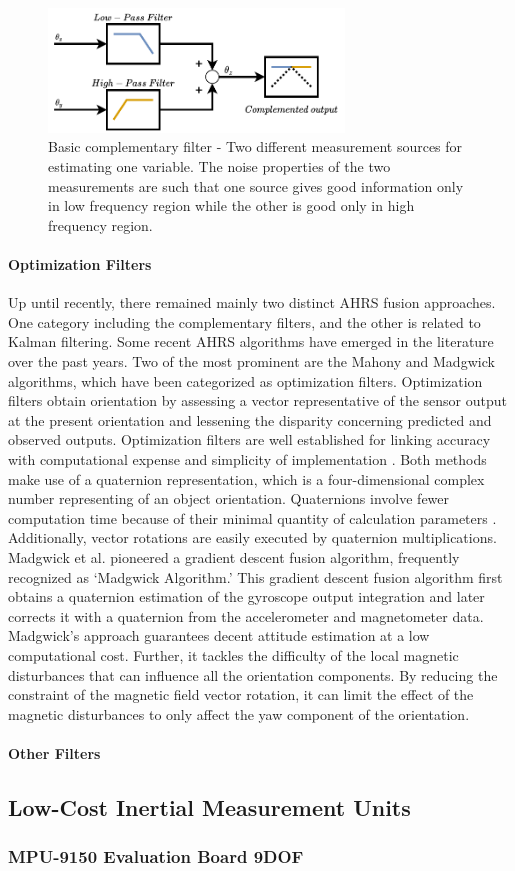 \begin{figure}[!h]
    \centering
    \includegraphics[width=0.7\textwidth]{figures/complementary.pdf}
    \caption{Basic complementary filter \cite{higgins1975comparison} - Two different measurement sources for estimating one variable. The noise properties of the two measurements are such that one source gives good information only in low frequency region while the other is good only in high frequency region. }
    \label{fig:complementary}
\end{figure}

\paragraph{Optimization Filters}

Up until recently, there remained mainly two distinct AHRS fusion approaches. One category including the complementary filters, and the other is related to Kalman filtering. Some recent AHRS algorithms have emerged in the literature over the past years. Two of the most prominent are the Mahony and Madgwick algorithms, which have been categorized as optimization filters. Optimization filters obtain orientation by assessing a vector representative of the sensor output at the present orientation and lessening the disparity concerning predicted and observed outputs. Optimization filters are well established for linking accuracy with computational expense and simplicity of implementation \cite{madgwick2020extended}.
Both methods make use of a quaternion representation, which is a four-dimensional complex number representing of an object orientation. Quaternions involve fewer computation time because of their minimal quantity of calculation parameters \cite{ludwig2018comparison}. Additionally, vector rotations are easily executed by quaternion multiplications.
Madgwick et al. \cite{madgwick2010efficient} pioneered a gradient descent fusion algorithm, frequently recognized as ‘Madgwick Algorithm.’ This gradient descent fusion algorithm first obtains a quaternion estimation of the gyroscope output integration and later corrects it with a quaternion from the accelerometer and magnetometer data. Madgwick’s approach guarantees decent attitude estimation at a low computational cost. Further, it tackles the difficulty of the local magnetic disturbances that can influence all the orientation components. By reducing the constraint of the magnetic field vector rotation, it can limit the effect of the magnetic disturbances to only affect the yaw component of the orientation.

\paragraph{Other Filters}
\subsection{Low-Cost Inertial Measurement Units}
\subsubsection{MPU-9150 Evaluation Board 9DOF}